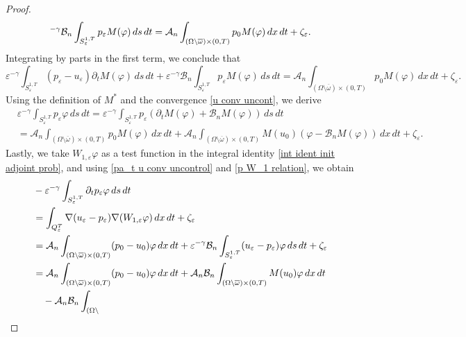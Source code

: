 \documentclass[10pt,a4paper]{amsart}
\numberwithin{equation}{section}
\begin{document}
\begin{proof}
\[^{-\gamma }\mathcal{B}_n\int _{S_{\varepsilon }^{1,T}}p_{\varepsilon }M(\varphi ){%
\,ds\,dt}=\mathcal{A}_n\int _{(\Omega \setminus \overline{\omega }%
)\times (0,T)}p_0M(\varphi )\,dx\,dt+\zeta _{\varepsilon }.
\]
Integrating by parts in the first term, we conclude that
\[
\varepsilon ^{-\gamma }\int _{S_{\varepsilon }^{1,T}}(p_{\varepsilon
}-u_{\varepsilon })\partial _{t}M(\varphi )\,ds\,dt+\varepsilon ^{-\gamma
}\mathcal{B}_n \int _{S_{\varepsilon }^{1,T}}p_{\varepsilon }M(\varphi )\,ds\,dt=%
\mathcal{A}_n\int _{(\Omega \setminus \overline{\omega })\times
(0,T)}p_0M(\varphi )\,dx\,dt+\zeta _{\varepsilon }.
\]
Using the definition of $M^{\ast }$ and the convergence
\eqref{u conv uncont}, we derive
\begin{equation}
\begin{aligned}
&\varepsilon ^{-\gamma }\int _{S_{\varepsilon }^{1,T}}p_{\varepsilon
}\varphi \,ds\,dt=\varepsilon ^{-\gamma }\int _{S_{\varepsilon
}^{1,T}}p_{\varepsilon }(\partial _{t}M(\varphi )+\mathcal{B}_nM(\varphi ))%
\,ds\,dt    \\
&=\mathcal{A}_n\int _{(\Omega \setminus \overline{\omega })\times
(0,T)}p_0M(\varphi )\,dx\,dt+\mathcal{A}_n\int _{(\Omega \setminus
\overline{\omega })\times (0,T)}M(u_0)(\varphi -\mathcal{B}_nM(\varphi ))
\,dx\,dt+\zeta _{\varepsilon }.
\end{aligned}  \label{p W_1 relation}
\end{equation}
Lastly, we take $W_{1,\varepsilon }\varphi $ as a test function in the
integral identity \eqref{int ident init adjoint prob}, and using
\eqref{pa_t u conv uncontrol} and \eqref{p W_1 relation}, we obtain
\begin{align*}
&-\varepsilon ^{-\gamma }\int _{S_{\varepsilon }^{1,T}}\partial
_{t}p_{\varepsilon }\varphi \,ds\,dt \\
&=\int _{Q_{\varepsilon }^{T}}\nabla
(u_{\varepsilon }-p_{\varepsilon })\nabla (W_{1,\varepsilon }\varphi )\,dx\,dt%
+\zeta _{\varepsilon } \\
&=\mathcal{A}_n\int _{(\Omega \setminus \overline{\omega })\times
(0,T)}(p_0-u_0)\varphi \,dx\,dt+\varepsilon ^{-\gamma }\mathcal{B}_n\int
_{S_{\varepsilon }^{1,T}}(u_{\varepsilon }-p_{\varepsilon })\varphi {%
\,ds\,dt}+\zeta _{\varepsilon } \\
&=\mathcal{A}_n\int _{(\Omega \setminus \overline{\omega })\times
(0,T)}(p_0-u_0)\varphi \,dx\,dt+\mathcal{A}_n\mathcal{B}_n\int
_{(\Omega \setminus \overline{\omega })\times (0,T)}M(u_0)\varphi {%
\,dx\,dt} \\
&\quad -\mathcal{A}_n\mathcal{B}_n\int _{(\Omega \setminus \overline{%
}}
\end{align*}
\end{proof}
\end{document}

